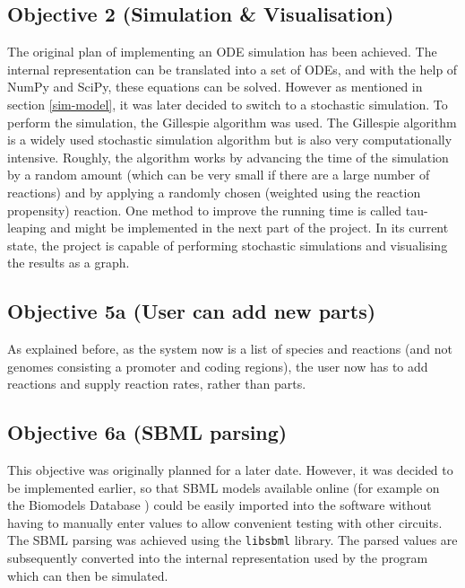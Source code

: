 \documentclass{article}
\begin{document}
	\subsection{Objective 2 (Simulation \& Visualisation)} 
	The original plan of implementing an ODE simulation has been achieved. The internal representation can be translated into a set of ODEs, and with the help of NumPy\cite{numpy} and SciPy\cite{scipy}, these equations can be solved. However as mentioned in section \ref{sim-model}, it was later decided to switch to a stochastic simulation. To perform the simulation, the Gillespie algorithm \cite{gillespie} was used. The Gillespie algorithm is a widely used stochastic simulation algorithm but is also very computationally intensive. Roughly, the algorithm works by advancing the time of the simulation by a random amount (which can be very small if there are a large number of reactions) and by applying a randomly chosen (weighted using the reaction propensity) reaction. One method to improve the running time is called tau-leaping and might be implemented in the next part of the project. In its current state, the project is capable of performing stochastic simulations and visualising the results as a graph.
	
	\subsection{Objective 5a (User can add new parts)} 
	As explained before, as the system now is a list of species and reactions (and not genomes consisting a promoter and coding regions), the user now has to add reactions and supply reaction rates, rather than parts.
	
	\subsection{Objective 6a (SBML parsing)} 
	This objective was originally planned for a later date. However, it was decided to be implemented earlier, so that SBML models available online (for example on the Biomodels Database \cite{biomodels}) could be easily imported into the software without having to manually enter values to allow convenient testing with other circuits. The SBML parsing was achieved using the \verb|libsbml| library. The parsed values are subsequently converted into the internal representation used by the program which can then be simulated. 
	
\end{document}
